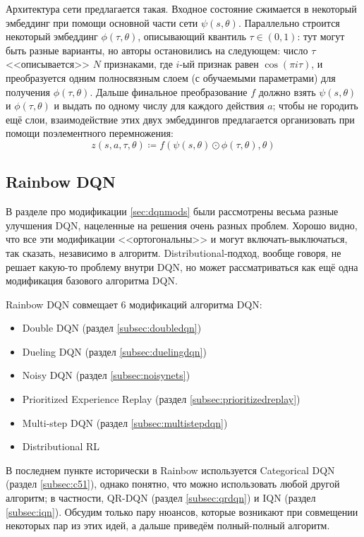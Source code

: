 \begin{remark}
Архитектура сети предлагается такая. Входное состояние сжимается в некоторый эмбеддинг при помощи основной части сети $\psi(s, \theta)$. Параллельно строится некоторый эмбеддинг $\phi(\tau, \theta)$, описывающий квантиль $\tau \in (0, 1)$: тут могут быть разные варианты, но авторы остановились на следующем: число $\tau$ <<описывается>> $N$ признаками, где $i$-ый признак равен $\cos(\pi i \tau)$, и преобразуется одним полносвязным слоем (с обучаемыми параметрами) для получения $\phi(\tau, \theta)$. Дальше финальное преобразование $f$ должно взять $\psi(s, \theta)$ и $\phi(\tau, \theta)$ и выдать по одному числу для каждого действия $a$; чтобы не городить ещё слои, взаимодействие этих двух эмбеддингов предлагается организовать при помощи поэлементного перемножения:
$$z(s, a, \tau, \theta) \coloneqq f(\psi(s, \theta) \odot \phi(\tau, \theta), \theta)$$
\end{remark}

\subsection{Rainbow DQN}\label{subsec:rainbow}

В разделе про модификации \ref{sec:dqnmods} были рассмотрены весьма разные улучшения DQN, нацеленные на решения очень разных проблем. Хорошо видно, что все эти модификации <<ортогональны>> и могут включать-выключаться, так сказать, независимо в алгоритм. Distributional-подход, вообще говоря, не решает какую-то проблему внутри DQN, но может рассматриваться как ещё одна модификация базового алгоритма DQN.

Rainbow DQN совмещает 6 модификаций алгоритма DQN:
\begin{itemize}
    \item Double DQN (раздел \ref{subsec:doubledqn})
    \item Dueling DQN (раздел \ref{subsec:duelingdqn})
    \item Noisy DQN  (раздел \ref{subsec:noisynets})
    \item Prioritized Experience Replay (раздел \ref{subsec:prioritizedreplay})
    \item Multi-step DQN (раздел \ref{subsec:multistepdqn})
    \item Distributional RL
\end{itemize}

В последнем пункте исторически в Rainbow используется Categorical DQN (раздел \ref{subsec:c51}), однако понятно, что можно использовать любой другой алгоритм; в частности, QR-DQN (раздел \ref{subsec:qrdqn}) и IQN (раздел \ref{subsec:iqn}). Обсудим только пару нюансов, которые возникают при совмещении некоторых пар из этих идей, а дальше приведём полный-полный алгоритм.

